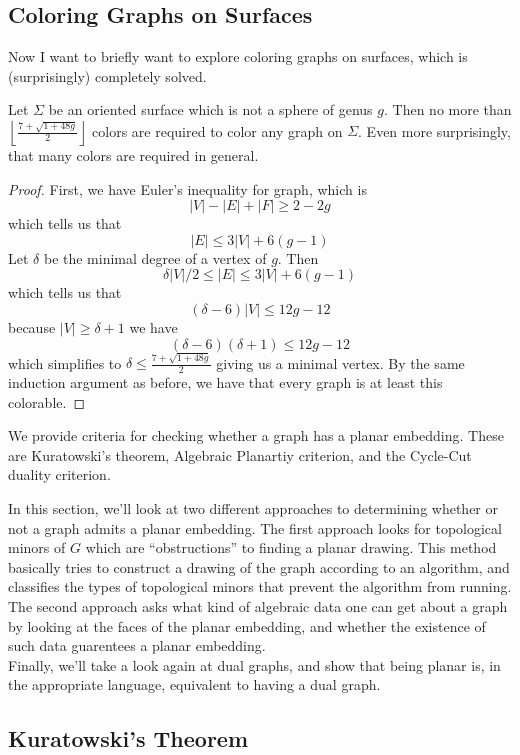 \subsection{Coloring Graphs on Surfaces}
Now I want to briefly  want to explore coloring graphs on surfaces, which is (surprisingly) completely solved. 
\begin{theorem}
 Let $\Sigma$ be an oriented surface which is not a sphere of genus $g$. Then no more than $\left \lfloor \frac{7+\sqrt{1+48g}}{2}\right \rfloor$ colors are required to color any graph on $\Sigma$. Even more surprisingly, that many colors are required in general. 
\end{theorem}
\begin{proof}
 First, we have Euler's inequality for graph, which is 
 \[|V|-|E|+|F|\geq 2-2g\]
 which tells us that 
 \[|E|\leq 3|V|+6(g-1)\]
 Let $\delta$ be the minimal degree of a vertex of $g$. Then 
 \[\delta |V|/2\leq |E|\leq 3|V|+6(g-1)\]
 which tells us that 
 \[(\delta-6)|V|\leq 12g-12\]
 because $|V|\geq \delta+1$ we have 
 \[(\delta-6)(\delta+1)\leq 12g-12\]
 which simplifies to $\delta\leq \frac{7+\sqrt{1+48g}}{2}$ giving us a minimal vertex. By the same induction argument as before, we have that every graph is at least this colorable. 
\end{proof}
\begin{elevator}
We provide criteria for checking whether a graph has a planar embedding. These are Kuratowski's theorem, Algebraic Planartiy criterion, and the Cycle-Cut duality criterion. 
\end{elevator}
\label{sec:planar:criterion}
In this section, we'll look at two different approaches to determining whether or not a graph admits a planar embedding. The first approach looks for topological minors of $G$ which are ``obstructions'' to finding a planar drawing. This method basically tries to construct a drawing of the graph according to an algorithm, and classifies the types of topological minors that prevent the algorithm from running.\\
The second approach asks what kind of algebraic data one can get about a graph by looking at the faces of the planar embedding, and whether the existence of such data guarentees a planar embedding. \\
Finally, we'll take a look again at dual graphs, and show that being planar is, in the appropriate language, equivalent to having a dual graph. 
\subsection{Kuratowski's Theorem}

